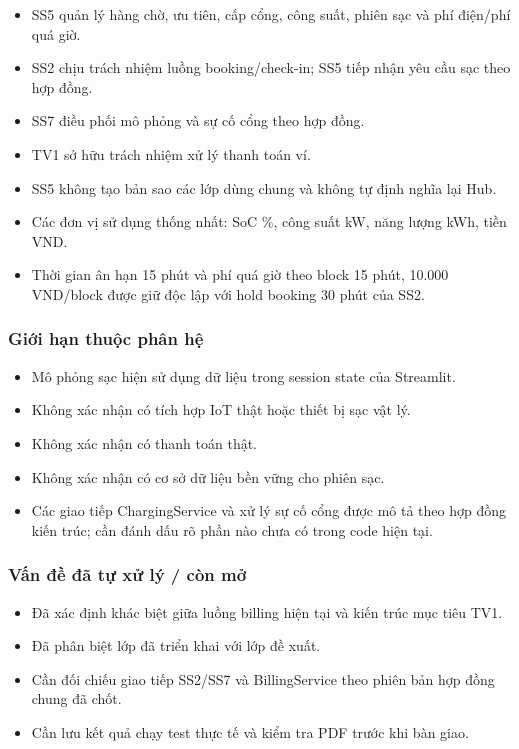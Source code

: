 \documentclass[11pt,a4paper]{article}
\providecommand{\tightlist}{%
  \setlength{\itemsep}{0pt}\setlength{\parskip}{0pt}}
\begin{document}
\begin{itemize}
\tightlist
\item
  SS5 quản lý hàng chờ, ưu tiên, cấp cổng, công suất, phiên sạc và phí
  điện/phí quá giờ.
\item
  SS2 chịu trách nhiệm luồng booking/check-in; SS5 tiếp nhận yêu cầu sạc
  theo hợp đồng.
\item
  SS7 điều phối mô phỏng và sự cố cổng theo hợp đồng.
\item
  TV1 sở hữu trách nhiệm xử lý thanh toán ví.
\item
  SS5 không tạo bản sao các lớp dùng chung và không tự định nghĩa lại
  Hub.
\item
  Các đơn vị sử dụng thống nhất: SoC \%, công suất kW, năng lượng kWh,
  tiền VND.
\item
  Thời gian ân hạn 15 phút và phí quá giờ theo block 15 phút, 10.000
  VND/block được giữ độc lập với hold booking 30 phút của SS2.
\end{itemize}

\hypertarget{giux1edbi-hux1ea1n-thuux1ed9c-phuxe2n-hux1ec7}{%
\subsubsection{Giới hạn thuộc phân
hệ}\label{giux1edbi-hux1ea1n-thuux1ed9c-phuxe2n-hux1ec7}}

\begin{itemize}
\tightlist
\item
  Mô phỏng sạc hiện sử dụng dữ liệu trong session state của Streamlit.
\item
  Không xác nhận có tích hợp IoT thật hoặc thiết bị sạc vật lý.
\item
  Không xác nhận có thanh toán thật.
\item
  Không xác nhận có cơ sở dữ liệu bền vững cho phiên sạc.
\item
  Các giao tiếp ChargingService và xử lý sự cố cổng được mô tả theo hợp
  đồng kiến trúc; cần đánh dấu rõ phần nào chưa có trong code hiện tại.
\end{itemize}

\hypertarget{vux1ea5n-ux111ux1ec1-ux111uxe3-tux1ef1-xux1eed-luxfd-cuxf2n-mux1edf}{%
\subsubsection{Vấn đề đã tự xử lý / còn
mở}\label{vux1ea5n-ux111ux1ec1-ux111uxe3-tux1ef1-xux1eed-luxfd-cuxf2n-mux1edf}}

\begin{itemize}
\tightlist
\item
  Đã xác định khác biệt giữa luồng billing hiện tại và kiến trúc mục
  tiêu TV1.
\item
  Đã phân biệt lớp đã triển khai với lớp đề xuất.
\item
  Cần đối chiếu giao tiếp SS2/SS7 và BillingService theo phiên bản hợp
  đồng chung đã chốt.
\item
  Cần lưu kết quả chạy test thực tế và kiểm tra PDF trước khi bàn giao.
\end{itemize}
\end{document}
